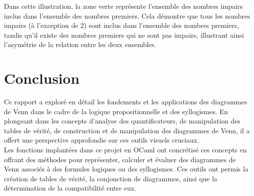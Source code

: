 \documentclass{article}
\begin{document}
\begin{center}
\end{center}
Dans cette illustration, la zone verte représente l'ensemble des nombres impairs inclus dans l'ensemble des nombres premiers. Cela démontre que tous les nombres impairs (à l'exception de 2) sont inclus dans l'ensemble des nombres premiers, tandis qu'il existe des nombres premiers qui ne sont pas impairs, illustrant ainsi l'asymétrie de la relation entre les deux ensembles.
\newpage

\section{Conclusion}

Ce rapport a exploré en détail les fondements et les applications des diagrammes de Venn dans le cadre de la logique propositionnelle et des syllogismes. En plongeant dans les concepts d'analyse des quantificateurs, de manipulation des tables de vérité, de construction et de manipulation des diagrammes de Venn, il a offert une perspective approfondie sur ces outils visuels cruciaux.\\

Les fonctions implantées dans ce projet en OCaml ont concrétisé ces concepts en offrant des méthodes pour représenter, calculer et évaluer des diagrammes de Venn associés à des formules logiques ou des syllogismes. Ces outils ont permis la création de tables de vérité, la conjonction de diagrammes, ainsi que la détermination de la compatibilité entre eux.\\
\end{document}
